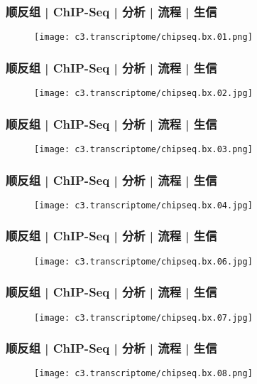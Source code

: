 \begin{frame}
  \frametitle{顺反组 | ChIP-Seq | 分析 | 流程 | 生信}
  \begin{figure}
    \centering
    \texttt{[image: c3.transcriptome/chipseq.bx.01.png]}
  \end{figure}
\end{frame}

\begin{frame}
  \frametitle{顺反组 | ChIP-Seq | 分析 | 流程 | 生信}
  \begin{figure}
    \centering
    \texttt{[image: c3.transcriptome/chipseq.bx.02.jpg]}
  \end{figure}
\end{frame}

\begin{frame}
  \frametitle{顺反组 | ChIP-Seq | 分析 | 流程 | 生信}
  \begin{figure}
    \centering
    \texttt{[image: c3.transcriptome/chipseq.bx.03.png]}
  \end{figure}
\end{frame}

\begin{frame}
  \frametitle{顺反组 | ChIP-Seq | 分析 | 流程 | 生信}
  \begin{figure}
    \centering
    \texttt{[image: c3.transcriptome/chipseq.bx.04.jpg]}
  \end{figure}
\end{frame}

\begin{frame}
  \frametitle{顺反组 | ChIP-Seq | 分析 | 流程 | 生信}
  \begin{figure}
    \centering
    \texttt{[image: c3.transcriptome/chipseq.bx.06.jpg]}
  \end{figure}
\end{frame}

\begin{frame}
  \frametitle{顺反组 | ChIP-Seq | 分析 | 流程 | 生信}
  \begin{figure}
    \centering
    \texttt{[image: c3.transcriptome/chipseq.bx.07.jpg]}
  \end{figure}
\end{frame}

\begin{frame}
  \frametitle{顺反组 | ChIP-Seq | 分析 | 流程 | 生信}
  \begin{figure}
    \centering
    \texttt{[image: c3.transcriptome/chipseq.bx.08.png]}
  \end{figure}
\end{frame}

